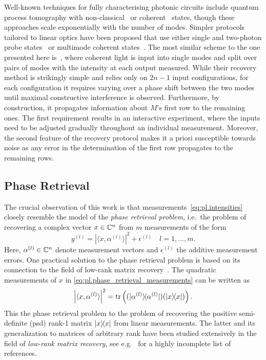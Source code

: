 Well-known techniques for fully characterising photonic circuits include quantum process tomography with non-classical~\cite{Brien_2004_Quantum} or coherent~\cite{Keshari_2011_Quantum} states, though these approaches scale exponentially with the number of modes.
Simpler protocols tailored to linear optics have been proposed that use either single and two-photon probe states~\cite{Laing_2012_SuperStable,Dhand_2016_Accurate,Spagnolo_2017_Learning} or multimode coherent states~\cite{Keshari_2013_Direct,Tillmann_2016_On}.
The most similar scheme to the one presented here is~\cite{Keshari_2013_Direct}, where coherent light is input into single modes and split over pairs of modes with the intensity at each output measured.
While their recovery method is strikingly simple and relies only on $2n-1$ input configurations, for each configuration it requires varying over a phase shift between the two modes until maximal constructive interference is observed.
Furthermore, by construction, it propagates information about ${M}$'s first row to the remaining ones.
The first requirement results in an interactive experiment, where the inputs need to be adjusted gradually throughout an individual measurement.
Moreover, the second feature of the recovery protocol makes it a priori susceptible towards noise as any error in the determination of the first row propagates to the remaining rows.



\subsection{Phase Retrieval}

The crucial observation of this work is that measurements~\eqref{eq:pl.intensities} closely resemble the model of the \textit{phase retrieval problem}, i.e.\ the problem of recovering a complex vector ${x} \in {\mathbb{C}}^n$ from $m$ measurements of the form
\[
  y^{(l)} = \left| \langle {x}, \alpha^{(l)} \rangle \right|^2 + \epsilon^{(l)}
  \quad l=1,\ldots,m.
  \label{eq:pl.phase_retrieval_measurements}
\]
Here, $\alpha^{(l)} \in {\mathbb{C}}^n$ denote measurement vectors and $\epsilon^{(l)}$ the additive measurement errors.
One practical solution to the phase retrieval problem is based on its connection to the field of low-rank matrix recovery~\cite{Ahmed_2014_Blind,Candes_2009_Exact,Candes_2011_Tight,Recht_2010_Guaranteed,Gross_2011_Recovering,Chen_2015_IncoherenceOptimal}.
The quadratic measurements of $x$ in \cref{eq:pl.phase_retrieval_measurements} can be written as
\[
  \left| \langle {x}, \alpha^{(l)} \rangle \right|^2
  = \tr \left( (\ket{\alpha^{(l)}}\bra{\alpha^{(l)}}) (\ket{{x}}\bra{{x}}) \right).
\]
This  the phase retrieval problem to the problem of recovering the positive semi-definite (psd) rank-1 matrix $\ketbra{x}$ from linear measurements.
The latter and its generalization to matrices of arbitrary rank have been studied extensively in the field of \emph{low-rank matrix recovery}, see e.g.~\cite{} for a highly incomplete list of references.

